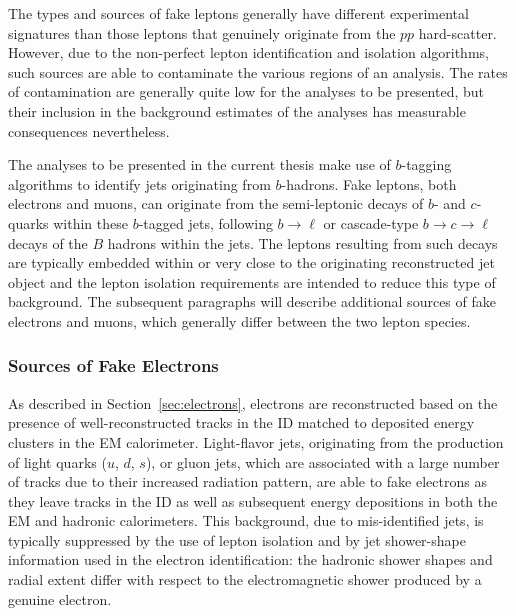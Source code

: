The types and sources of fake leptons generally have different experimental signatures
than those leptons that genuinely originate from the $pp$ hard-scatter.
However, due to the non-perfect lepton identification and isolation algorithms,
such sources are able to contaminate the various regions of an analysis.
The rates of contamination are generally quite low for the analyses to be presented, but their inclusion in the background
estimates of the analyses has measurable consequences nevertheless.

The analyses to be presented in the current thesis make use of $b$-tagging algorithms
to identify jets originating from $b$-hadrons.
Fake leptons, both electrons and muons, can originate from the semi-leptonic decays of
$b$- and $c$-quarks within these $b$-tagged jets, following $b\rightarrow \ell$ or cascade-type
$b \rightarrow c \rightarrow \ell$ decays of the $B$ hadrons within the jets.
The leptons resulting from such decays are typically embedded within or very close to
the originating reconstructed jet object and the lepton isolation requirements
are intended to reduce this type of background.
The subsequent paragraphs will describe additional sources of fake electrons
and muons, which generally differ between the two lepton species.

%
%
\subsubsection{Sources of Fake Electrons}
\label{sec:fake_electron_sources}

As described in Section~\ref{sec:electrons}, electrons are reconstructed based
on the presence of well-reconstructed tracks in the ID matched to deposited
energy clusters in the EM calorimeter.
Light-flavor jets, originating from the production of light quarks ($u$, $d$, $s$),
or gluon jets, which are associated with a large number of tracks due to their
increased radiation pattern, are able to fake electrons as they leave
tracks in the ID as well as subsequent energy depositions in both the EM and hadronic calorimeters.
This background, due to mis-identified jets, is typically suppressed by the use
of lepton isolation and by jet shower-shape information used in the electron identification: the
hadronic shower shapes and radial extent differ with respect to the electromagnetic shower
produced by a genuine electron.

